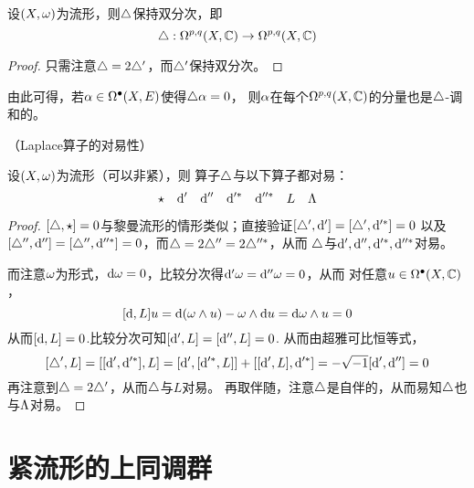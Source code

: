 \begin{cor}
\label{Kahler-Laplace 保持双分次-cor}
设$(X,\omega)$为\Kahler 流形，则$\triangle$保持双分次，即
$$
  \triangle:\Omega^{p,q}(X,\mathbb{C})\to\Omega^{p,q}(X,\mathbb{C})
$$
\end{cor}

\begin{proof}
只需注意$\triangle=2\triangle'$，而$\triangle'$保持双分次。
\end{proof}
由此可得，若$\alpha\in\Omega^{\bullet}(X,E)$使得$\triangle\alpha=0$，
则$\alpha$在每个$\Omega^{p,q}(X,\mathbb{C})$的分量也是$\triangle$-调和的。

\begin{thm}（Laplace算子的对易性）
\label{紧Kahler-Laplace算子对易性}

设$(X,\omega)$为\Kahler 流形（可以非紧），则
算子$\triangle$与以下算子都对易：
$$
  \star\quad
  \mathrm{d}'\quad
  \mathrm{d}''\quad
  \mathrm{d}'^*\quad
  \mathrm{d}''^*\quad
  L\quad
  \Lambda
$$
\end{thm}

\begin{proof}
$[\triangle,\star]=0$与黎曼流形的情形类似；直接验证$[\triangle',\mathrm{d}']=[\triangle',\mathrm{d}'^*]=0$
以及$[\triangle'',\mathrm{d}'']=[\triangle'',\mathrm{d}''^*]=0$，而$\triangle=2\triangle''=2\triangle''^*$，从而
$\triangle$与$\mathrm{d}',\mathrm{d}'',\mathrm{d}'^*,\mathrm{d}''^*$对易。

而注意$\omega$为\Kahler 形式，$\mathrm{d}\omega=0$，比较分次得$\mathrm{d}'\omega=\mathrm{d}''\omega=0$，从而
对任意$u\in\Omega^{\bullet}(X,\mathbb{C})$，
$$
  [\mathrm{d},L]u
=
  \mathrm{d}(\omega\wedge u)-\omega\wedge\mathrm{d} u
=
  \mathrm{d}\omega\wedge u=0
$$
从而$[\mathrm{d},L]=0$.比较分次可知$[\mathrm{d}',L]=[\mathrm{d}'',L]=0$.
从而由超雅可比恒等式，
$$
  [\triangle',L]=[[\mathrm{d}',\mathrm{d}'^*],L]
=
  [\mathrm{d}',[\mathrm{d}'^*,L]]+[[\mathrm{d}',L],\mathrm{d}'^*]
=
  -\sqrt{-1}[\mathrm{d}',\mathrm{d}'']
=0
$$
再注意到$\triangle=2\triangle'$，从而$\triangle$与$L$对易。
再取伴随，注意$\triangle$是自伴的，从而易知$\triangle$也与$\Lambda$对易。
\end{proof}


\section{紧\Kahler 流形的上同调群}


